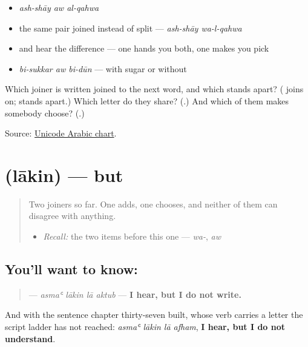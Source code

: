 \begin{itemize}
\raggedright
  \item \emph{ash-shāy aw al-qahwa}
  \item the same pair joined instead of split — \emph{ash-shāy wa-l-qahwa}
  \item and hear the difference — one hands you both, one makes you pick
  \item \emph{bi-sukkar aw bi-dūn} — with sugar or without
\end{itemize}

\begin{tcolorbox}[breakable,colback=teal!4,colframe=teal!35!black,title={Before you move on}]
Which joiner is written joined to the next word, and which stands apart? (\textbf{} joins on; \textbf{} stands apart.) Which letter do they share? (\textbf{}.) And which of them makes somebody choose? (\textbf{}.)

Source: \href{https://www.unicode.org/charts/PDF/U0600.pdf}{Unicode Arabic chart}.
\end{tcolorbox}
\section[\texorpdfstring{\ar{لكن} (lākin)}{لكن (lākin)}]{ (lākin) — but}

\label{lesson:AR-C38-lakin}



\begin{quote}
Two joiners so far. One adds, one chooses, and neither of them can disagree with anything.

\begin{itemize}
\raggedright
  \item \emph{Recall:} the two items before this one — \emph{wa-}, \emph{aw}
\end{itemize}
\end{quote}

\subsection*{You'll want to know: }
\begin{quote}
\textbf{   } — \emph{asmaʿ lākin lā aktub} — \textbf{I hear, but I do not write.}
\end{quote}

And with the sentence chapter thirty-seven built, whose verb carries a letter the script ladder has not reached: \emph{asmaʿ lākin lā afham}, \textbf{I hear, but I do not understand}.

